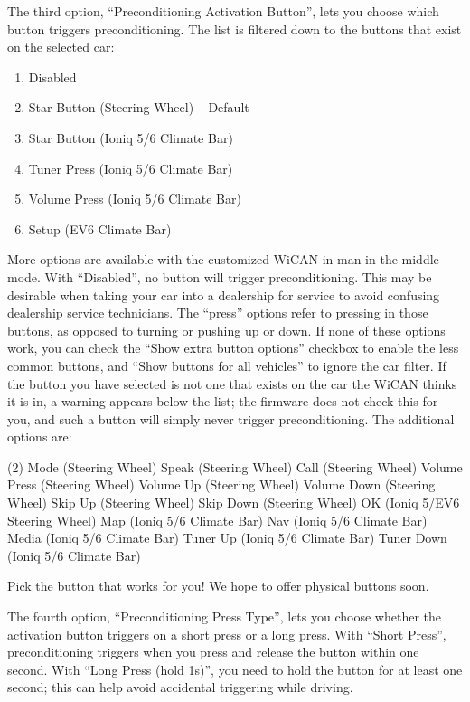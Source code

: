 \documentclass[superscriptaddress,onecolumn,floatfix]{revtex4-2}
\begin{document}
The third option, ``Preconditioning Activation Button'', lets you choose which button triggers preconditioning. The list is filtered down to the buttons that exist on the selected car:
\begin{enumerate}
  \item Disabled
  \item Star Button (Steering Wheel) -- Default
  \item Star Button (Ioniq 5/6 Climate Bar)
  \item Tuner Press (Ioniq 5/6 Climate Bar)
  \item Volume Press (Ioniq 5/6 Climate Bar)
  \item Setup (EV6 Climate Bar)
\end{enumerate}
More options are available with the customized WiCAN in man-in-the-middle mode.
With ``Disabled'', no button will trigger preconditioning. This may be desirable when taking your car into a dealership for service to avoid confusing dealership service technicians. The ``press'' options refer to pressing in those buttons, as opposed to turning or pushing up or down. If none of these options work, you can check the ``Show extra button options'' checkbox to enable the less common buttons, and ``Show buttons for all vehicles'' to ignore the car filter. If the button you have selected is not one that exists on the car the WiCAN thinks it is in, a warning appears below the list; the firmware does not check this for you, and such a button will simply never trigger preconditioning. The additional options are:
\begin{tasks}(2)
  \task Mode (Steering Wheel)
  \task Speak (Steering Wheel)
  \task Call (Steering Wheel)
  \task Volume Press (Steering Wheel)
  \task Volume Up (Steering Wheel)
  \task Volume Down (Steering Wheel)
  \task Skip Up (Steering Wheel)
  \task Skip Down (Steering Wheel)
  \task OK (Ioniq 5/EV6 Steering Wheel)
  \task Map (Ioniq 5/6 Climate Bar)
  \task Nav (Ioniq 5/6 Climate Bar)
  \task Media (Ioniq 5/6 Climate Bar)
  \task Tuner Up (Ioniq 5/6 Climate Bar)
  \task Tuner Down (Ioniq 5/6 Climate Bar)
\end{tasks}
Pick the button that works for you! We hope to offer physical buttons soon.

The fourth option, ``Preconditioning Press Type'', lets you choose whether the activation button triggers on a short press or a long press. With ``Short Press'', preconditioning triggers when you press and release the button within one second. With ``Long Press (hold 1s)'', you need to hold the button for at least one second; this can help avoid accidental triggering while driving.
\end{document}
